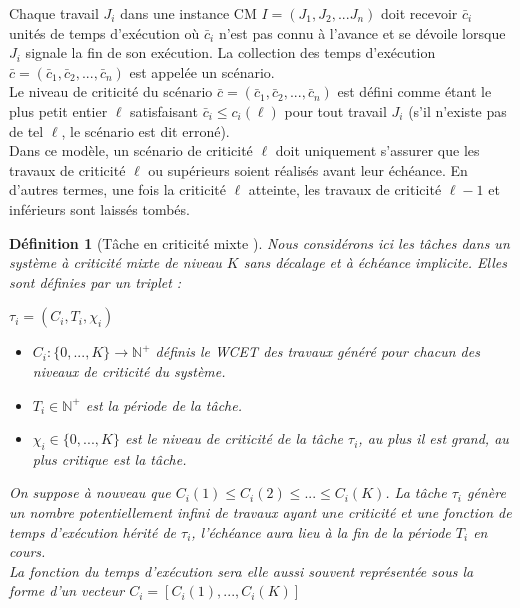 \documentclass[a4paper]{report}
\theoremstyle{break}
\newtheorem{defin}{Définition}
\begin{document}
Chaque travail $J_i$ dans une instance CM $I = (J_1, J_2, ... J_n)$ doit recevoir $\bar{c}_i$ unités de temps d'exécution où $\bar{c}_i$ n'est pas connu à l'avance et se dévoile lorsque $J_i$ signale la fin de son exécution. La collection des temps d'exécution $\bar{c} = (\bar{c}_1, \bar{c}_2, ..., \bar{c}_n)$ est appelée un scénario.\\
Le niveau de criticité du scénario $\bar{c} = (\bar{c}_1, \bar{c}_2, ..., \bar{c}_n)$ est défini comme étant le plus petit entier $\ell$ satisfaisant $\bar{c}_i \leq c_i(\ell)$ pour tout travail $J_i$ (s'il n'existe pas de tel $\ell$, le scénario est dit erroné).\\

Dans ce modèle, un scénario de criticité $\ell$ doit uniquement s'assurer que les travaux de criticité $\ell$ ou supérieurs soient réalisés avant leur échéance. En d'autres termes, une fois la criticité $\ell$ atteinte, les travaux de criticité $\ell-1$ et inférieurs sont laissés tombés.

\begin{defin}[Tâche en criticité mixte \cite{BaruahBDMSS11}]
Nous considérons ici les tâches dans un système à criticité mixte de niveau $K$ sans décalage et à échéance implicite. Elles sont définies par un triplet :
\begin{center}
$\tau_i = (C_i, T_i, \chi_i)$\\
\end{center}
\begin{itemize}
\item $C_i : \{0, ..., K\} \rightarrow \mathbb{N}^{+}$ définis le WCET des travaux généré pour chacun des niveaux de criticité du système.
\item $T_i \in \mathbb{N}^{+}$ est la période de la tâche.
\item $\chi_i \in \{0, ..., K\}$ est le niveau de criticité de la tâche $\tau_i$, au plus il est grand, au plus critique est la tâche.
\end{itemize}
On suppose à nouveau que $C_i(1) \leq C_i(2) \leq ... \leq C_i(K)$. La tâche $\tau_i$ génère un nombre potentiellement infini de travaux ayant une criticité et une fonction de temps d'exécution hérité de $\tau_i$, l'échéance aura lieu à la fin de la période $T_i$ en cours.\\
La fonction du temps d'exécution sera elle aussi souvent représentée sous la forme d'un vecteur $C_i = [C_i(1), ..., C_i(K)]$
\end{defin}
\end{document}
